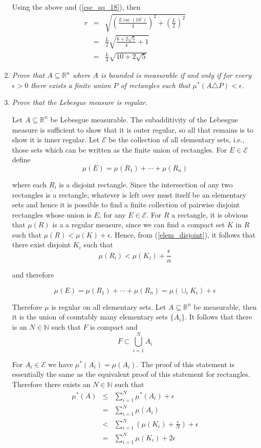 \documentclass[11pt]{article}
\newcommand{\R}{\mathbb{R}}
\newcommand{\N}{\mathbb{N}}
\begin{document}
\begin{enumerate}
Using the above and (\ref{csc_sq_18}), then
\begin{eqnarray*}
r &=& \sqrt{\left(\frac{L \csc(18^\circ)}{4}\right)^2 + \left(\frac{L}{2}\right)^2} \\
&=& \frac{L}{2}\sqrt{\frac{6 + 2\sqrt{5}}{4} + 1} \\
&=& \frac{L}{4}\sqrt{10 + 2\sqrt{5}}
\end{eqnarray*}
\item \emph{Prove that $A \subseteq \R^n$ where $A$ is bounded is measurable if and only if for every $\epsilon > 0$ there exists a finite union $P$ of rectangles such that $\mu^\ast(A \triangle P) < \epsilon$.}

\item \emph{Prove that the Lebesgue measure is regular.}

Let $A \subseteq \R^n$ be Lebesgue measurable.  The subadditivity of the Lebesgue measure is sufficient to show that it is outer regular, so all that remains is to show it is inner regular.  Let $\mathcal{E}$ be the collection of all elementary sets, i.e., those sets which can be written as the finite union of rectangles.  For $E \in \mathcal{E}$ define 
\begin{equation}
\label{elem_disjoint}
\mu(E) = \mu(R_1) + \cdots + \mu(R_n)
\end{equation}

where each $R_i$ is a disjoint rectangle.  Since the intersection of any two rectangles is a rectangle, whatever is left over must itself be an elementary sets and hence it is possible to find a finite collection of pairwise disjoint rectangles whose union is $E$, for any $E \in \mathcal{E}$.  For $R$ a rectangle, it is obvious that $\mu(R)$ is a a regular measure, since we can find a compact set $K$ in $R$ such that $\mu(R) < \mu(K) + \epsilon$.  Hence, from (\ref{elem_disjoint}), it follows that there exist disjoint $K_i$ such that
\[
\mu(R_i) < \mu(K_i) + \frac{\epsilon}{n}
\]

and therefore

\[
\mu(E) = \mu(R_1) + \cdots + \mu(R_n) = \mu(\cup_i K_i) + \epsilon
\]

Therefore $\mu$ is regular on all elementary sets.  Let $A \subseteq \R^n$ be measurable, then it is the union of countably many elementary sets $\{A_i\}$.  It follows that there is an $N \in \N$ such that $F$ is compact and 
\[
F \subset \bigcup_{i=1}^N A_i
\]

For $A_i \in \mathcal{E}$ we have $\mu^\ast(A_i) = \mu(A_i)$.  The proof of this statement is essentially the same as the equivalent proof of this statement for rectangles.  Therefore there exists an $N \in \mathbb{N}$ such that 
\begin{eqnarray*}
\mu^\ast(A) &\leq& \sum_{i=1}^N \mu^\ast(A_i) + \epsilon\\
&=& \sum_{i=1}^N \mu(A_i) \\
&<& \sum_{i=1}^N \left( \mu(K_i) + \frac{\epsilon}{N} \right) + \epsilon \\
&=& \sum_{i=1}^N \mu(K_i) + 2\epsilon
\end{eqnarray*}


\end{enumerate}
\end{document}
